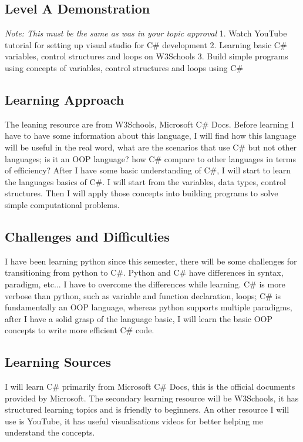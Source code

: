 \documentclass[a4paper, 11pt]{report}
\begin{document}
\subsection{Level A Demonstration}
\textit{Note: This must be the same as was in your topic approval}
1. Watch YouTube tutorial for setting up visual studio for C# development
2. Learning basic C# variables, control structures and loops on W3Schools
3. Build simple programs using concepts of variables, control structures and loops using C# 
\subsection{Learning Approach}
The leaning resource are from W3Schools, Microsoft C# Docs. Before learning I have to have some information about this language, I will find how this language will be useful in the real word, what are the  scenarios that use C# but not other languages; is it an OOP language? how C# compare to other languages in terms of efficiency? 
After I have some basic understanding of C#, I will start to learn the languages basics of C#. I will start from the variables, data types, control structures. Then I will apply those concepts into building programs to solve simple computational problems.

\subsection{Challenges and Difficulties}
I have been learning python since this semester, there will be some challenges for transitioning from python to C#. Python and C# have differences in syntax, paradigm, etc... I have to overcome the differences while learning. C# is more verbose than python, such as variable and function declaration, loops; C# is fundamentally an OOP language, whereas python supports multiple paradigms, after I have a solid grasp of the language basic, I will learn the basic OOP concepts to write more efficient C# code. 

\subsection{Learning Sources}
I will learn C# primarily from Microsoft C# Docs, this is the official documents provided by Microsoft. The secondary learning resource will be W3Schools, it has structured learning topics and is friendly to beginners. An other resource I will use is YouTube, it has useful visualisations videos for better helping me understand the concepts.
\end{document}
